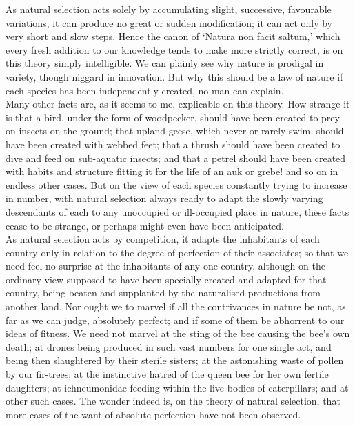 \indent As natural selection acts solely by accumulating slight, successive, favourable variations, it can produce no great or sudden modification; it can act only by very short and slow steps.  Hence the canon of `Natura non facit saltum,' which every fresh addition to our knowledge tends to make more strictly correct, is on this theory simply intelligible. We can plainly see why nature is prodigal in variety, though niggard in innovation. But why this should be a law of nature if each species has been independently created, no man can explain.~\\
\indent Many other facts are, as it seems to me, explicable on this theory. How strange it is that a bird, under the form of woodpecker, should have been created to prey on insects on the ground; that upland geese, which never or rarely swim, should have been created with webbed feet; that a thrush should have been created to dive and feed on sub-aquatic insects; and that a petrel should have been created with habits and structure fitting it for the life of an auk or grebe! and so on in endless other cases. But on the view of each species constantly trying to increase in number, with natural selection always ready to adapt the slowly varying descendants of each to any unoccupied or ill-occupied place in nature, these facts cease to be strange, or perhaps might even have been anticipated.~\\
\indent As natural selection acts by competition, it adapts the inhabitants of each country only in relation to the degree of perfection of their associates; so that we need feel no surprise at the inhabitants of any one country, although on the ordinary view supposed to have been specially created and adapted for that country, being beaten and supplanted by the naturalised productions from another land. Nor ought we to marvel if all the contrivances in nature be not, as far as we can judge, absolutely perfect; and if some of them be abhorrent to our ideas of fitness. We need not marvel at the sting of the bee causing the bee's own death; at drones being produced in such vast numbers for one single act, and being then slaughtered by their sterile sisters; at the astonishing waste of pollen by our fir-trees; at the instinctive hatred of the queen bee for her own fertile daughters; at ichneumonidae feeding within the live bodies of caterpillars; and at other such cases. The wonder indeed is, on the theory of natural selection, that more cases of the want of absolute perfection have not been observed.~\\
